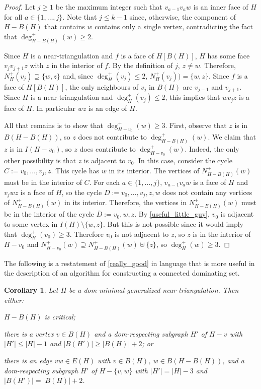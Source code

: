\documentclass{article}
\newtheorem{cor}{Corollary}
\theoremstyle{definition}
\begin{document}
\begin{proof}
  Let $j\ge 1$ be the maximum integer such that $v_{a-1}v_{a}w$ is an inner face of $H$ for all $a\in\{1,\ldots,j\}$.  Note that $j\le k-1$ since, otherwise, the component of $H-B(H)$ that contains $w$ contains only a single vertex, contradicting the fact that $\deg^+_{H-B(H)}(w)\ge 2$.

  Since $H$ is a near-triangulation and $f$ is a face of $H[B(H)]$, $H$ has some face $v_j v_{j+1} z$ with $z$ in the interior of $f$.  By the definition of $j$, $z\neq w$.  Therefore, $N_H^+(v_j)\supseteq \{w,z\}$ and, since $\deg^+_H(v_j)\le 2$, $N_H^+(v_j))= \{w,z\}$.
  Since $f$ is a face of $H[B(H)]$, the only neighbours of $v_j$ in $B(H)$ are $v_{j-1}$ and $v_{j+1}$. Since $H$ is a near-triangulation and $\deg^+_H(v_j)\le 2$, this implies that $w v_j z$ is a face of $H$.  In particular $wz$ is an edge of $H$.

  All that remains is to show that $\deg^+_{H-v_0}(w)\ge 3$.  First, observe that $z$ is in $B(H-B(H))$, so $z$ does not contribute to $\deg^+_{H-B(H)}(w)$. We claim that $z$ is in $I(H-v_0)$, so $z$ does contribute to $\deg^+_{H-v_0}(w)$.   Indeed, the only other possibility is that $z$ is adjacent to $v_0$.  In this case, consider the cycle $C:=v_0,\ldots,v_j,z$.  This cycle has $w$ in its interior. The vertices of $N^+_{H-B(H)}(w)$ must be in the interior of $C$. For each $a\in\{1,\ldots,j\}$, $v_{a-1}v_a w$ is a face of $H$ and $v_jwz$ is a face of $H$, so the cycle $D:=v_0,\ldots,v_j,z,w$ does not contain any vertices of $N^+_{H-B(H)}(w)$ in its interior.  Therefore, the vertices in $N^+_{H-B(H)}(w)$ must be in the interior of the cycle $\overline{D}:=v_0,w,z$.  By \cref{useful_little_guy}, $v_0$ is adjacent to some vertex in $I(H)\setminus\{w,z\}$. But this is not possible since it would imply that $\deg^+_H(v_0)\ge 3$.  Therefore $v_0$ is not adjacent to $z$, so $z$ is in the interior of $H-v_0$ and $N^+_{H-v_0}(w)\supseteq N^+_{H-B(H)}(w)\uplus\{z\}$, so $\deg^+_H(w)\ge 3$.
\end{proof}


The following is a restatement of \cref{really_good} in language that is more useful in the description of an algorithm for constructing a connected dominating set.

\begin{cor}\label{really_good_cor}
  Let $H$ be a dom-minimal generalized near-triangulation.  Then either:
  \begin{compactenum}[(1)]
    \item $H-B(H)$ is critical;
    \item there is a vertex $v\in B(H)$ and a dom-respecting subgraph $H'$ of  $H-v$ with $|H'|\le |H|-1$ and $|B(H')|\ge |B(H)|+2$; or
    \item there is an edge $vw\in E(H)$ with $v\in B(H)$, $w\in B(H-B(H))$, and a dom-respecting subgraph $H'$ of $H-\{v,w\}$ with $|H'|= |H|-3$ and $|B(H')|=|B(H)|+2$.
  \end{compactenum}
\end{cor}
\end{document}
